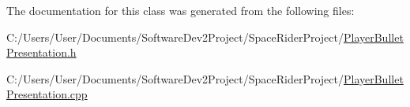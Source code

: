 The documentation for this class was generated from the following files\+:\begin{DoxyCompactItemize}
\item 
C\+:/\+Users/\+User/\+Documents/\+Software\+Dev2\+Project/\+Space\+Rider\+Project/\hyperlink{_player_bullet_presentation_8h}{Player\+Bullet\+Presentation.\+h}\item 
C\+:/\+Users/\+User/\+Documents/\+Software\+Dev2\+Project/\+Space\+Rider\+Project/\hyperlink{_player_bullet_presentation_8cpp}{Player\+Bullet\+Presentation.\+cpp}\end{DoxyCompactItemize}
